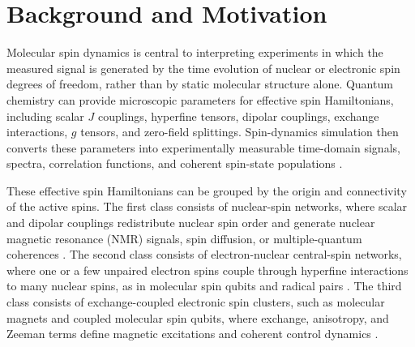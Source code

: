 \documentclass[12pt]{article}
\begin{document}
\setcounter{page}{1}


\section{Background and Motivation}

Molecular spin dynamics is central to interpreting experiments in which the measured signal is generated by the time evolution of nuclear or electronic spin degrees of freedom, rather than by static molecular structure alone.
Quantum chemistry can provide microscopic parameters for effective spin Hamiltonians, including scalar $J$ couplings, hyperfine tensors, dipolar couplings, exchange interactions, $g$ tensors, and zero-field splittings.
Spin-dynamics simulation then converts these parameters into experimentally measurable time-domain signals, spectra, correlation functions, and coherent spin-state populations \cite{Hogben2011Spinach,Ledbetter2009ZeroFieldJSpectra}.

These effective spin Hamiltonians can be grouped by the origin and connectivity of the active spins.
The first class consists of nuclear-spin networks, where scalar and dipolar couplings redistribute nuclear spin order and generate nuclear magnetic resonance (NMR) signals, spin diffusion, or multiple-quantum coherences \cite{Hogben2011Spinach}.
The second class consists of electron-nuclear central-spin networks, where one or a few unpaired electron spins couple through hyperfine interactions to many nuclear spins, as in molecular spin qubits and radical pairs \cite{Chen2020DecoherenceMolecularQubits,Antill2024RadicalPy}.
The third class consists of exchange-coupled electronic spin clusters, such as molecular magnets and coupled molecular spin qubits, where exchange, anisotropy, and Zeeman terms define magnetic excitations and coherent control dynamics \cite{Coronado2020MolecularMagnetism}.
\end{document}
